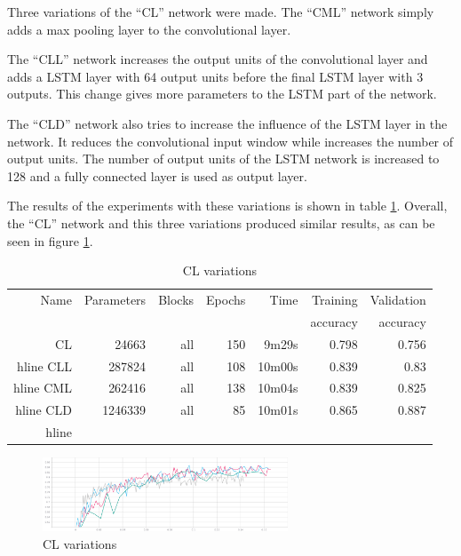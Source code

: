 
Three variations of the ``CL'' network were made.
The ``CML'' network simply adds a max pooling layer to the convolutional layer.

The ``CLL'' network increases the output units of the convolutional layer and adds a LSTM layer with 64 output units before the final LSTM layer with 3 outputs. This change gives more parameters to the LSTM part of the network.

The ``CLD'' network also tries to increase the influence of the LSTM layer in the network. It reduces the convolutional input window while increases the number of output units. The number of output units of the LSTM network is increased to 128 and a fully connected layer is used as output layer.

The results of the experiments with these variations is shown in table \ref{tab:carvingclvariations}.
Overall, the ``CL'' network and this three variations produced similar results, as can be seen in figure \ref{fig:cl-variations}.

\begin{table}[!ht]
    \centering
    \caption{CL variations}
    \label{tab:carvingclvariations}
\begin{tabular}{r|r|r|r|r|r|r}
\hline
Name & Parameters & Blocks & Epochs & Time    & Training          & Validation          \\       
     &            &        &        &         &          accuracy &            accuracy \\ \hline\hline

CL	    & 24663	    & all	& 150	& 9m29s	    & 0.798	& 0.756 \\hline
CLL	    & 287824	& all	& 108	& 10m00s	& 0.839	& 0.83 \\hline
CML	    & 262416	& all	& 138	& 10m04s	& 0.839	& 0.825 \\hline
CLD	    & 1246339	& all	& 85	& 10m01s	& 0.865	& 0.887 \\hline
\end{tabular}
\end{table}

\begin{figure}[htb!]
\centering\includegraphics[width=0.65\textwidth]{content/cl-variations.png}
\caption{\label{fig:cl-variations}CL variations}%
\end{figure}
